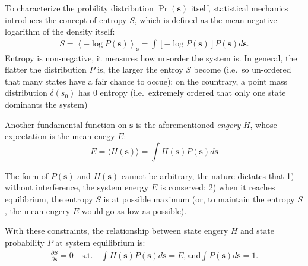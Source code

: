 \documentclass[11pt]{book}
\def\style{apa}
\numberwithin{equation}{chapter}
\newcommand{\bs}{\boldsymbol}
\newcommand{\mean}[2]{\left\langle{#1}\right\rangle_{#2}}
\newcommand{\vs}{\bs{s}}
\newcommand{\ev}[1]{\langle #1 \rangle}
\newcommand{\PDV}[2]{\frac{\partial #1}{\partial #2}}
\begin{document}
To characterize the probility distribution $\Pr(\vs)$ itself, statistical mechanics introduces the concept of entropy $S$, which is defined as the mean negative logarithm of the density itself:
\begin{align}
  S = \mean{-\log{P(\vs)}}{\vs} = \int{[-\log{P(\vs)}]P(\vs)d\vs}.
\end{align}
Entropy is non-negative, it measures how un-order the system is. In general, the flatter the distribution $P$ is, the larger the entroy $S$ become (i.e.\, so un-ordered that many states have a fair chance to occue); on the countrary, a point mass distribution $\delta(s_0)$ has 0 entropy (i.e.\, extremely ordered that only one state dominants the system)

Another fundamental function on $\vs$ is the aforementioned \textit{engery} $H$, whose expectation is the mean enegy $E$:
\[ E = \ev{H(\vs)} = \int{H(\vs)P(\vs)d\vs} \]

The form of $P(\vs)$ and $H(\vs)$ cannot be arbitrary, the nature dictates that 1) without interference, the system energy $E$ is conserved; 2) when it reaches equilibrium, the entropy $S$ is at possible maximum (or, to maintain the entropy $S$, the mean engery $E$ would go as low as possible).

With these constraints, the relationship between state engery $H$ and state probability $P$ at system equilibrium  is:
\begin{equation}
  \begin{split}
    \PDV{S}{\vs} = 0 
    \quad\textrm{s.t.}\quad\int{H(\vs)P(\vs)d\vs} = E, \textrm{and} \int{P(\vs)d\vs} = 1.
  \end{split}
\end{equation}

\clearpage
\singlespacing


%
\end{document}
